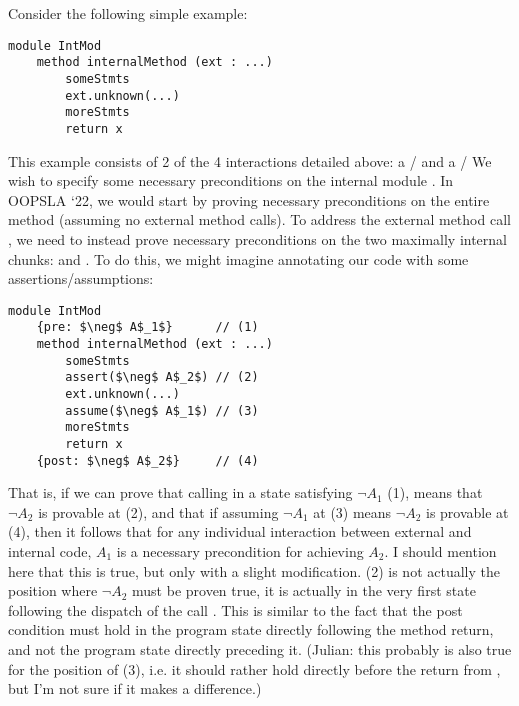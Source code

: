 \documentclass[11pt]{article} %
\theoremstyle{definition}
\begin{document}
Consider the following simple example:
\begin{lstlisting}[language = Chainmail, mathescape=true, frame=lines]
module IntMod
	method internalMethod (ext : ...)
		someStmts
		ext.unknown(...)
		moreStmts
		return x
\end{lstlisting}
This example consists of 2 of the 4 interactions detailed above:
a \textbf{}/\textbf{} and a \textbf{}/\textbf{}
We wish to specify some necessary preconditions on the internal 
module . In OOPSLA `22, we would start by proving 
necessary preconditions on the entire method 
(assuming no external method calls). To address the external method
call , we need to instead prove necessary 
preconditions on the two maximally internal chunks:  and .
To do this, we might imagine annotating our code with some assertions/assumptions:
\begin{lstlisting}[language = Chainmail, mathescape=true, frame=lines]
module IntMod
	{pre: $\neg$ A$_1$}      // (1)
	method internalMethod (ext : ...)
		someStmts
		assert($\neg$ A$_2$) // (2)
		ext.unknown(...)
		assume($\neg$ A$_1$) // (3)
		moreStmts
		return x
	{post: $\neg$ A$_2$}     // (4)
\end{lstlisting}
That is, if we can prove that calling  in a state
satisfying $\neg A_1$ (1), means that $\neg A_2$ is provable
at (2), and that if assuming $\neg A_1$ at (3) means $\neg A_2$ is provable
at (4), then it follows that for any individual interaction between
external and internal code, $A_1$ is a necessary precondition for achieving $A_2$.
I should mention here that this is true, but only with a slight modification. 
(2) is not actually the position where $\neg A_2$ must be proven true, it is actually
in the very first state following the dispatch of the call . This 
is similar to the fact that the post condition must hold in the program state 
directly following the method return, and not the program state directly preceding it.
(Julian: this probably is also true for the position of (3), i.e. it should rather hold
directly before the return from , but I'm not sure if it makes a
difference.)
\end{document}
